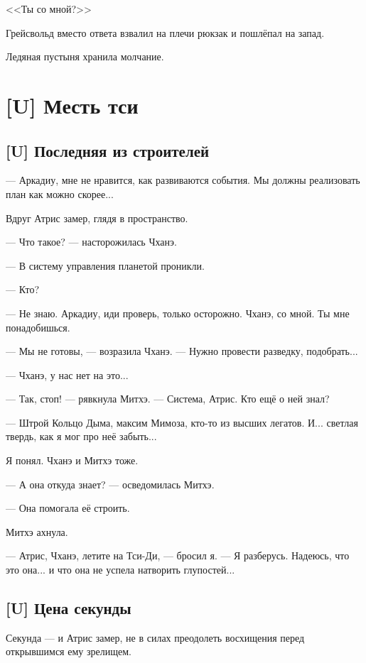 <<Ты со мной?>>

Грейсвольд вместо ответа взвалил на плечи рюкзак и пошлёпал на запад.

Ледяная пустыня хранила молчание.

\chapter{[U] Месть тси}

\section{[U] Последняя из строителей}

\textspace

--- Аркадиу, мне не нравится, как развиваются события.
Мы должны реализовать план как можно скорее...

Вдруг Атрис замер, глядя в пространство.

--- Что такое? --- насторожилась Чханэ.

--- В систему управления планетой проникли.

--- Кто?

--- Не знаю.
Аркадиу, иди проверь, только осторожно.
Чханэ, со мной.
Ты мне понадобишься.

--- Мы не готовы, --- возразила Чханэ.
--- Нужно провести разведку, подобрать...

--- Чханэ, у нас нет на это...

--- Так, стоп! --- рявкнула Митхэ.
--- Система, Атрис.
Кто ещё о ней знал?

--- Штрой Кольцо Дыма, максим Мимоза, кто-то из высших легатов.
И... светлая твердь, как я мог про неё забыть...

Я понял.
Чханэ и Митхэ тоже.

--- А она откуда знает? --- осведомилась Митхэ.

--- Она помогала её строить.

Митхэ ахнула.

--- Атрис, Чханэ, летите на Тси-Ди, --- бросил я.
--- Я разберусь.
Надеюсь, что это она... и что она не успела натворить глупостей...


\section{[U] Цена секунды}

Секунда --- и Атрис замер, не в силах преодолеть восхищения перед открывшимся ему зрелищем.

